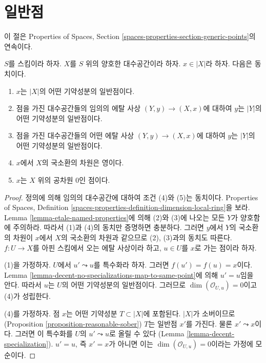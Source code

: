 \section{일반점}
\label{section-generic-points}

\noindent
이 절은 Properties of Spaces, Section
\ref{spaces-properties-section-generic-points}의 연속이다.

\begin{lemma}
\label{lemma-decent-generic-points}
$S$를 스킴이라 하자. $X$를 $S$ 위의 양호한 대수공간이라 하자.
$x \in |X|$라 하자. 다음은 동치이다.
\begin{enumerate}
\item $x$는 $|X|$의 어떤 기약성분의 일반점이다.
\item 점을 가진 대수공간들의 임의의 에탈 사상
$(Y, y) \to (X, x)$에 대하여 $y$는 $|Y|$의 어떤 기약성분의
일반점이다.
\item 점을 가진 대수공간들의 어떤 에탈 사상
$(Y, y) \to (X, x)$에 대하여 $y$는 $|Y|$의 어떤 기약성분의
일반점이다.
\item $x$에서 $X$의 국소환의 차원은 영이다.
\item $x$는 $X$ 위의 공차원 $0$인 점이다.
\end{enumerate}
\end{lemma}

\begin{proof}
정의에 의해 임의의 대수공간에 대하여 조건 (4)와 (5)는 동치이다.
Properties of Spaces, Definition
\ref{spaces-properties-definition-dimension-local-ring}을 보라.
Lemma \ref{lemma-etale-named-properties}에 의해 (2)와 (3)에 나오는
모든 $Y$가 양호함에 주의하라. 따라서 (1)과 (4)의 동치만 증명하면
충분하다. 그러면 $y$에서 $Y$의 국소환의 차원이 $x$에서 $X$의
국소환의 차원과 같으므로 (2), (3)과의 동치도 따른다.
$f : U \to X$를 아핀 스킴에서 오는 에탈 사상이라 하고,
$u \in U$를 $x$로 가는 점이라 하자.

\medskip\noindent
(1)을 가정하자. $U$에서 $u' \leadsto u$를 특수화라 하자.
그러면 $f(u') = f(u) = x$이다. Lemma
\ref{lemma-decent-no-specializations-map-to-same-point}에 의해
$u' = u$임을 안다. 따라서 $u$는 $U$의 어떤 기약성분의 일반점이다.
그러므로 $\dim(\mathcal{O}_{U, u}) = 0$이고 (4)가 성립한다.

\medskip\noindent
(4)를 가정하자. 점 $x$는 어떤 기약성분 $T \subset |X|$에 포함된다.
$|X|$가 소버이므로(Proposition \ref{proposition-reasonable-sober})
$T$는 일반점 $x'$를 가진다. 물론 $x' \leadsto x$이다.
그러면 이 특수화를 $U$의 $u' \leadsto u$로 올릴 수 있다
(Lemma \ref{lemma-decent-specialization}). $u' = u$, 즉 $x' = x$가
아니면 이는 $\dim(\mathcal{O}_{U, u}) = 0$이라는 가정에 모순이다.
\end{proof}

